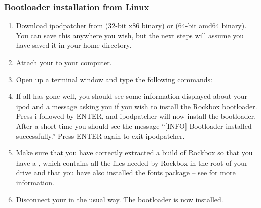 \subsubsection{Bootloader installation from Linux}

\begin{enumerate}

\item Download ipodpatcher from
 (32-bit x86 
binary) or  
(64-bit amd64 binary). You can save this anywhere you wish, but the next 
steps will assume you have saved it in your home directory.

\item Attach your \dap{} to your computer.

\item Open up a terminal window and type the following commands:



\item If all has gone well, you should see some information displayed about
your ipod and a message asking you if you wish to install the Rockbox
bootloader. Press i followed by ENTER, and ipodpatcher will now install the
bootloader. After a short time you should see the message ``[INFO] Bootloader
installed successfully.'' Press ENTER again to exit ipodpatcher.

\item Make sure that you have correctly extracted a build of Rockbox so that
you have a , which contains all the files needed by Rockbox
in the root of your \daps{} drive and that you have also installed the fonts
package -- see  for more information.

\item Disconnect your \dap{} in the usual way. The bootloader is now installed.

\end{enumerate}
